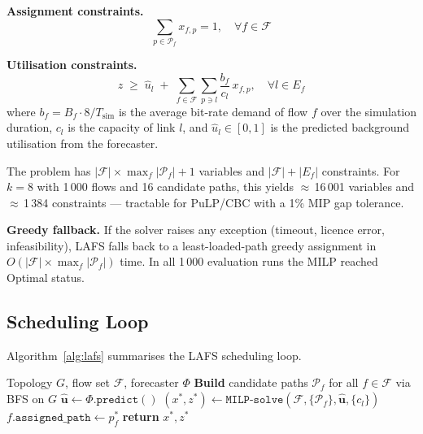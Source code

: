 \documentclass[runningheads]{llncs}
\begin{document}
\medskip
\noindent\textbf{Assignment constraints.}
\begin{equation}
  \sum_{p \in \mathcal{P}_f} x_{f,p} = 1, \quad \forall f \in \mathcal{F}
  \label{eq:assign}
\end{equation}

\medskip
\noindent\textbf{Utilisation constraints.}
\begin{equation}
  z \;\geq\; \hat{u}_l \;+\; \sum_{f \in \mathcal{F}} \sum_{p \ni l} \frac{b_f}{c_l} \,x_{f,p}, \quad \forall l \in E_f
  \label{eq:util}
\end{equation}
where $b_f = B_f \cdot 8 / T_{\text{sim}}$ is the average bit-rate demand of flow $f$ over the simulation duration, $c_l$ is the capacity of link $l$, and $\hat{u}_l \in [0,1]$ is the predicted background utilisation from the forecaster.

\medskip
The problem has $|\mathcal{F}| \times \max_f |\mathcal{P}_f| + 1$ variables and $|\mathcal{F}| + |E_f|$ constraints. For $k{=}8$ with 1\,000 flows and 16 candidate paths, this yields $\approx$\,16\,001 variables and $\approx$\,1\,384 constraints — tractable for PuLP/CBC with a 1\% MIP gap tolerance.

\textbf{Greedy fallback.} If the solver raises any exception (timeout, licence error, infeasibility), LAFS falls back to a least-loaded-path greedy assignment in $O(|\mathcal{F}| \times \max_f |\mathcal{P}_f|)$ time. In all 1\,000 evaluation runs the MILP reached Optimal status.

\subsection{Scheduling Loop}

Algorithm~\ref{alg:lafs} summarises the LAFS scheduling loop.

\begin{algorithm}
\caption{LAFS Scheduling Loop}
\label{alg:lafs}
\begin{algorithmic}[1]
\Require Topology $G$, flow set $\mathcal{F}$, forecaster $\Phi$
\State \textbf{Build} candidate paths $\mathcal{P}_f$ for all $f \in \mathcal{F}$ via BFS on $G$
\State $\hat{\mathbf{u}} \leftarrow \Phi.\texttt{predict}()$ 
\State $(x^*, z^*) \leftarrow \texttt{MILP-solve}(\mathcal{F}, \{\mathcal{P}_f\}, \hat{\mathbf{u}}, \{c_l\})$
  \State $f.\texttt{assigned\_path} \leftarrow p^*_f$ 
\EndFor
\State \textbf{return} $x^*, z^*$
\end{algorithmic}
\end{algorithm}
\end{document}
